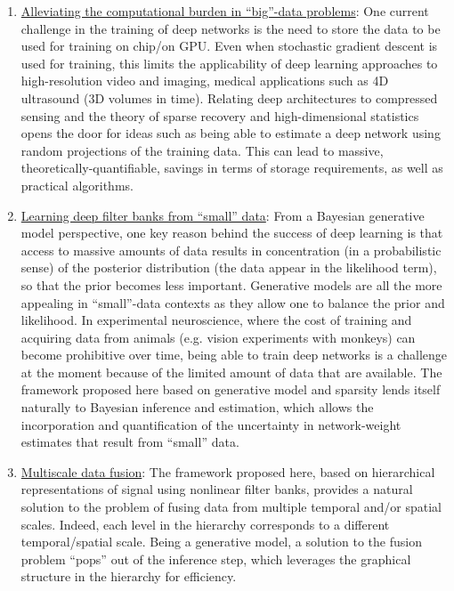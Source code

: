\documentclass[12pt]{article}
\begin{document}
\begin{enumerate}
	\item \underline{Alleviating the computational burden in ``big''-data problems}: One current challenge in the training of deep networks is the need to store the data to be used for training on chip/on GPU. Even when stochastic gradient descent is used for training, this limits the applicability of deep learning approaches to high-resolution video and imaging, medical applications such as 4D ultrasound (3D volumes in time). Relating deep architectures to compressed sensing and the theory of sparse recovery and high-dimensional statistics opens the door for ideas such as being able to estimate a deep network using random projections of the training data. This can lead to massive, theoretically-quantifiable, savings in terms of storage requirements, as well as practical algorithms.

	\item \underline{Learning deep filter banks from ``small'' data}:  From a Bayesian generative model perspective, one key reason behind the success of deep learning is that access to massive amounts of data results in concentration (in a probabilistic sense) of the posterior distribution  (the data appear in the likelihood term), so that the prior becomes less important. Generative models are all the more appealing in ``small''-data contexts as they allow one to balance the prior and likelihood. In experimental neuroscience, where the cost of training and acquiring data from animals (e.g. vision experiments with monkeys) can become prohibitive over time, being able to train deep networks is a challenge at the moment because of the limited amount of data that are available. The framework proposed here based on generative model and sparsity lends itself naturally to Bayesian inference and estimation, which allows the incorporation and quantification of the uncertainty in network-weight estimates that result from ``small'' data.
	
	\item \underline{Multiscale data fusion}: The framework proposed here, based on hierarchical representations of signal using nonlinear filter banks, provides a natural solution to the problem of fusing data from multiple temporal and/or spatial scales. Indeed, each level in the hierarchy corresponds to a different temporal/spatial scale. Being a generative model, a solution to the fusion problem ``pops'' out of the inference step, which leverages the graphical structure in the hierarchy for efficiency.
	

\end{enumerate}
\end{document}
